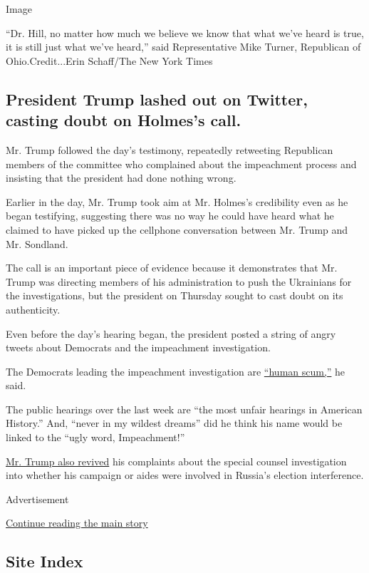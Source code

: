 Image

``Dr. Hill, no matter how much we believe we know that what we've heard
is true, it is still just what we've heard,'' said Representative Mike
Turner, Republican of Ohio.Credit...Erin Schaff/The New York Times

\hypertarget{president-trump-lashed-out-on-twitter-casting-doubt-on-holmess-call}{%
\subsection{President Trump lashed out on Twitter, casting doubt on
Holmes's
call.}\label{president-trump-lashed-out-on-twitter-casting-doubt-on-holmess-call}}

Mr. Trump followed the day's testimony, repeatedly retweeting Republican
members of the committee who complained about the impeachment process
and insisting that the president had done nothing wrong.

Earlier in the day, Mr. Trump took aim at Mr. Holmes's credibility even
as he began testifying, suggesting there was no way he could have heard
what he claimed to have picked up the cellphone conversation between Mr.
Trump and Mr. Sondland.

The call is an important piece of evidence because it demonstrates that
Mr. Trump was directing members of his administration to push the
Ukrainians for the investigations, but the president on Thursday sought
to cast doubt on its authenticity.

Even before the day's hearing began, the president posted a string of
angry tweets about Democrats and the impeachment investigation.

The Democrats leading the impeachment investigation are
\href{https://twitter.com/realDonaldTrump/status/1197503790729121794}{``human
scum,''} he said.

The public hearings over the last week are ``the most unfair hearings in
American History.'' And, ``never in my wildest dreams'' did he think his
name would be linked to the ``ugly word, Impeachment!''

\href{https://twitter.com/realDonaldTrump/status/1197499642243670018}{Mr.
Trump also revived} his complaints about the special counsel
investigation into whether his campaign or aides were involved in
Russia's election interference.

Advertisement

\protect\hyperlink{after-bottom}{Continue reading the main story}

\hypertarget{site-index}{%
\subsection{Site Index}\label{site-index}}

